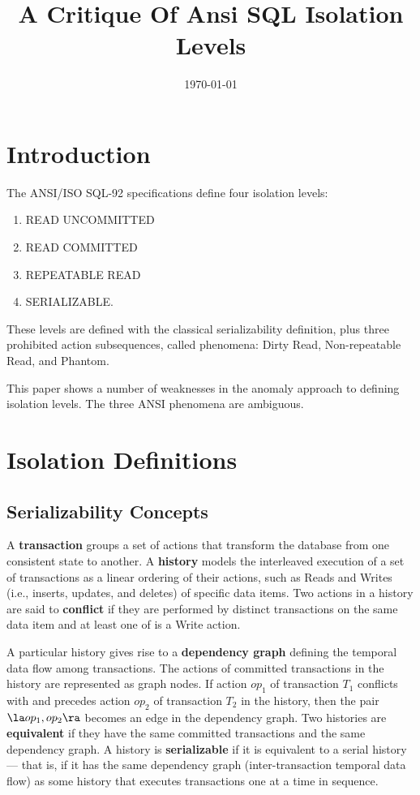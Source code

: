 \documentclass[11pt]{article}
\date{\today}
\title{A Critique Of Ansi SQL Isolation Levels}
\begin{document}
\maketitle
\section{Introduction}
\label{sec:orge8c2f78}
The ANSI/ISO SQL-92 specifications define four isolation levels:
\begin{enumerate}
\item READ UNCOMMITTED
\item READ COMMITTED
\item REPEATABLE READ
\item SERIALIZABLE.
\end{enumerate}

These levels are defined with the classical serializability definition, plus three prohibited action
subsequences, called phenomena: Dirty Read, Non-repeatable Read, and Phantom.

This paper shows a number of weaknesses in the anomaly approach to defining isolation levels. The
three ANSI phenomena are ambiguous.
\section{Isolation Definitions}
\label{sec:org60bb3a2}
\subsection{Serializability Concepts}
\label{sec:org302ad26}
A \textbf{transaction} groups a set of actions that transform the database from one consistent state to
another. A \textbf{history} models the interleaved execution of a set of transactions as a linear ordering of
their actions, such as Reads and Writes (i.e., inserts, updates, and deletes) of specific data items.
Two actions in a history are said to \textbf{conflict} if they are performed by distinct transactions on the
same data item and at least one of is a Write action.

A particular history gives rise to a \textbf{dependency graph} defining the temporal data flow among
transactions. The actions of committed transactions in the history are represented as graph nodes. If
action \(op_1\) of transaction \(T_1\) conflicts with and precedes action \(op_2\) of transaction
\(T_2\) in the history, then the pair \(\la op_1,op_2\ra\) becomes an edge in the dependency graph.
Two histories are \textbf{equivalent} if they have the same committed transactions and the same dependency
graph. A history is \textbf{serializable} if it is equivalent to a serial history — that is, if it has the same
dependency graph (inter-transaction temporal data flow) as some history that executes transactions one
at a time in sequence.
\end{document}
